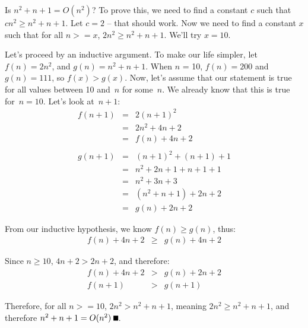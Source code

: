 \documentclass[onecolumn,11pt]{article}
\begin{document}
Is $n^2 + n + 1 = O(n^2)$?   To prove this, we need to find a constant $c$
such that $cn^2 \ge n^2 + n + 1$.  Let $c=2$ -- that should work.  Now we need
to find a constant $x$ such that for all $n >= x$, 
$2n^2 \ge n^2 + n + 1$.  We'll try $x = 10$.  

Let's proceed by an inductive argument.  To make our life simpler, let $f(n) = 2n^2$, 
and $g(n) = n^2 + n + 1$.  When $n$ = 10, $f(n) = 200$ and $g(n) = 111$, so
$f(x) > g(x)$.
Now, let's assume that our statement is true for all values between
10 and~$n$ for some~$n$.  We already know that this is true for~$n=10$.
Let's look at~$n+1$:
\begin{eqnarray*}
f(n+1) & = & 2(n+1)^2 \\ & = & 2n^2 + 4n + 2 \\
 & = & f(n) + 4n + 2\\
& & \\
g(n+1) & = & (n+1)^2 + (n+1) + 1 \\ & = & n^2 + 2n + 1 + n + 1 + 1\\
    & = & n^2 + 3n + 3 \\
    & = & (n^2 + n + 1) + 2n + 2 \\
    & = & g(n) + 2n + 2
\end{eqnarray*}

From our inductive hypothesis, we know $f(n) \ge g(n)$, thus:
\begin{eqnarray*}
f(n) + 4n + 2 & \ge & g(n) + 4n +2
\end{eqnarray*}

Since $n \ge 10$, $4n + 2 > 2n + 2$, and therefore:
\begin{eqnarray*}
f(n) + 4n + 2 & > & g(n) + 2n +2\\
f(n+1) & > & g(n+1)
\end{eqnarray*}

Therefore, for all $n >= 10$, $2n^2 > n^2 + n + 1$, meaning 
$2n^2 \ge n^2 + n + 1$, and therefore $n^2 + n + 1 = O(n^2) \; \rule{2mm}{2mm}$.
\end{document}
